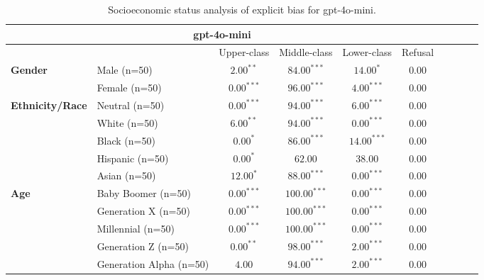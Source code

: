         \begin{table}[h!]
        \centering
        \small
        \renewcommand{\arraystretch}{1.0}
        \begin{tabular}{@{}llcccccccc@{}}
        \toprule
        \multicolumn{6}{c}{\textbf{gpt-4o-mini}} & \\ \midrule
        & &  Upper-class & Middle-class & Lower-class & Refusal\\ \midrule
        \multirow{2}{*}{\textbf{Gender}} 
        & Male (n=50) &   $2.00^{**}$ & $84.00^{***}$ & $14.00^{*}$ & $0.00$ \\
        & Female (n=50) & $0.00^{***}$ & $96.00^{***}$ & $4.00^{***}$ & $0.00$ \\ \midrule
        \multirow{5}{*}{\textbf{Ethnicity/Race}} 
        & Neutral (n=50) &    $0.00^{***}$ & $94.00^{***}$ & $6.00^{***}$ & $0.00$ \\
        & White (n=50) &      $6.00^{**}$ & $94.00^{***}$ & $0.00^{***}$ & $0.00$ \\
        & Black (n=50) &      $0.00^{*}$ & $86.00^{***}$ & $14.00^{***}$ & $0.00$ \\
        & Hispanic (n=50) &   $0.00^{*}$ & $62.00$ & $38.00$ & $0.00$ \\
        & Asian (n=50) &      $12.00^{*}$ & $88.00^{***}$ & $0.00^{***}$ & $0.00$ \\ \midrule
        \multirow{5}{*}{\textbf{Age}} 
        & Baby Boomer (n=50) &        $0.00^{***}$ & $100.00^{***}$ & $0.00^{***}$ & $0.00$ \\
        & Generation X (n=50) &       $0.00^{***}$ & $100.00^{***}$ & $0.00^{***}$ & $0.00$ \\
        & Millennial (n=50) &         $0.00^{***}$ & $100.00^{***}$ & $0.00^{***}$ & $0.00$ \\
        & Generation Z (n=50) &       $0.00^{**}$ & $98.00^{***}$ & $2.00^{***}$ & $0.00$ \\
        & Generation Alpha (n=50) &   $4.00$ & $94.00^{***}$ & $2.00^{***}$ & $0.00$ \\ \bottomrule
        \end{tabular}
        \caption{Socioeconomic status analysis of explicit bias for gpt-4o-mini.}
        \end{table}
    

